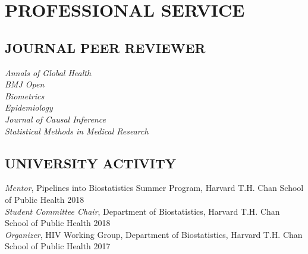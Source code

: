 \documentclass[12pt]{article}
\begin{document}
\section*{\textbf{{\large P}{ROFESSIONAL} {\large S}{ERVICE}}}
\subsection*{\textbf{JOURNAL PEER REVIEWER}}
\textit{Annals of Global Health} \\ 
\textit{BMJ Open} \\ 
\textit{Biometrics} \\
\textit{Epidemiology} \\
\textit{Journal of Causal Inference} \\ 
\textit{Statistical Methods in Medical Research}

\subsection*{\textbf{UNIVERSITY ACTIVITY}}
\textit{Mentor}, Pipelines into Biostatistics Summer Program, Harvard T.H. Chan School of
Public Health \hfill \hfill 2018 \\
\textit{Student Committee Chair}, Department of Biostatistics, Harvard T.H. Chan School of
Public Health \hfill \hfill 2018 \\
\textit{Organizer}, HIV Working Group, Department of Biostatistics, Harvard T.H. Chan School of
Public Health \hfill \hfill 2017 
\end{document}
